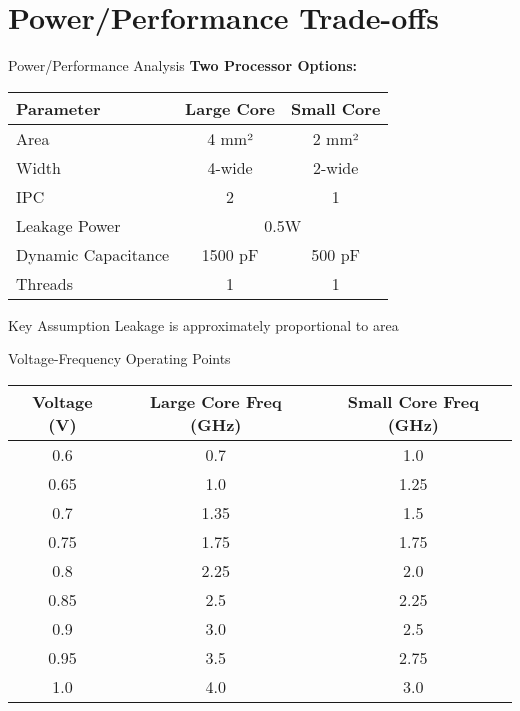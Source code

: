 \documentclass[aspectratio=169,12pt]{beamer}
\begin{document}
\section{Power/Performance Trade-offs}

\begin{frame}{Power/Performance Analysis}
\textbf{Two Processor Options:}

\begin{table}
\centering
\begin{tabular}{lcc}
\toprule
Parameter & Large Core & Small Core \\
\midrule
Area & 4 mm² & 2 mm² \\
Width & 4-wide & 2-wide \\
IPC & 2 & 1 \\
Leakage Power & \multicolumn{2}{c}{0.5W} \\
Dynamic Capacitance & 1500 pF & 500 pF \\
Threads & 1 & 1 \\
\bottomrule
\end{tabular}
\end{table}

\begin{block}{Key Assumption}
Leakage is approximately proportional to area
\end{block}
\end{frame}

\begin{frame}{Voltage-Frequency Operating Points}
\begin{table}
\centering
\small
\begin{tabular}{ccc}
\toprule
Voltage (V) & Large Core Freq (GHz) & Small Core Freq (GHz) \\
\midrule
0.6 & 0.7 & 1.0 \\
0.65 & 1.0 & 1.25 \\
0.7 & 1.35 & 1.5 \\
0.75 & 1.75 & 1.75 \\
0.8 & 2.25 & 2.0 \\
0.85 & 2.5 & 2.25 \\
0.9 & 3.0 & 2.5 \\
0.95 & 3.5 & 2.75 \\
1.0 & 4.0 & 3.0 \\
\bottomrule
\end{tabular}
\end{table}
\end{frame}
\end{document}

